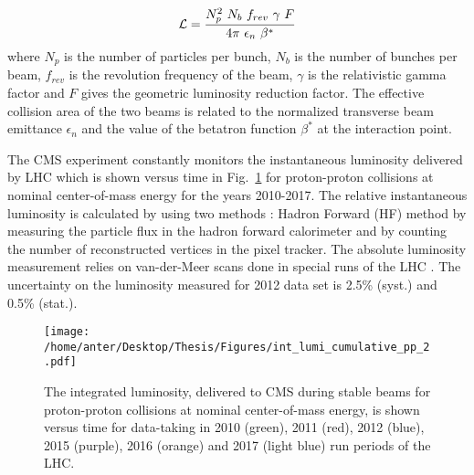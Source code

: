 \begin{equation}
\lumi = \frac{N^2_p~N_b~f_{rev}~\gamma~F}{4\pi~\epsilon_n~\beta^*}
\end{equation}
where $N_p$ is the number of particles per bunch, $N_b$ is the number of bunches per beam, $f_{rev}$ is the revolution frequency of the beam, $\gamma$ is the relativistic gamma factor and $F$ gives the geometric luminosity reduction factor. The effective collision area of the two beams is related to the normalized transverse beam emittance $\epsilon_n$ and the value of the betatron function $ \beta^*$ at the interaction point.
 
The CMS experiment constantly monitors the instantaneous luminosity delivered by LHC which is shown versus time in Fig.~\ref{fig:lumi} for proton-proton collisions at nominal center-of-mass energy for the years 2010-2017. The relative instantaneous luminosity is calculated by using two methods \cite{CMS:2013gfa} : Hadron Forward (HF) method by measuring the particle flux in the hadron forward calorimeter and by counting the number of reconstructed vertices in the pixel tracker. The absolute luminosity measurement relies on van-der-Meer scans done in special runs of the LHC \cite{vanderMeer:1968zz}. The uncertainty on the luminosity measured for 2012 data set is 2.5\% (syst.) and 0.5\% (stat.).

\begin{figure}[!h]
 \begin{center}
 \vspace*{4mm} 
 \texttt{[image: /home/anter/Desktop/Thesis/Figures/int\_lumi\_cumulative\_pp\_2.pdf]}\\
 \vspace*{5mm}
 \caption[The integrated luminosity, delivered to CMS during stable beams for proton-proton collisions.]{The integrated luminosity, delivered to CMS during stable beams for proton-proton collisions at nominal center-of-mass energy, is shown versus time for data-taking in 2010 (green), 2011 (red), 2012 (blue), 2015 (purple), 2016 (orange) and 2017 (light blue) run periods of the LHC\footnotemark.}
 \label{fig:lumi}
 \end{center}
\end{figure}

